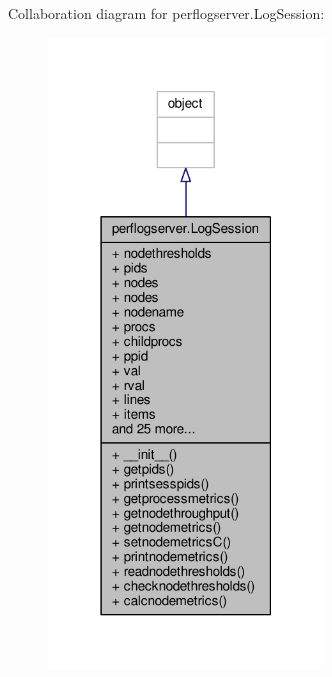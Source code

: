 Collaboration diagram for perflogserver.\+Log\+Session\+:
\nopagebreak
\begin{figure}[H]
\begin{center}
\leavevmode
\includegraphics[width=207pt]{classperflogserver_1_1_log_session__coll__graph}
\end{center}
\end{figure}
